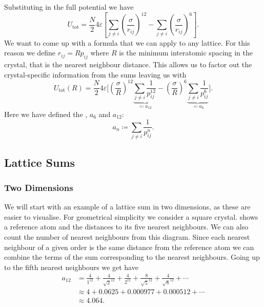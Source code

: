 \documentclass[fleqn]{NotesClass}
\newcommand*{\tot}{\mathrm{tot}}
\begin{document}
    Substituting in the full potential we have
    \begin{equation}
        U_{\tot} = \frac{N}{2}4\varepsilon \left[ \sum_{j\ne i}\left( \frac{\sigma}{r_{ij}} \right)^{12} - \sum_{j\ne i} \left( \frac{\sigma}{r_{ij}} \right)^{6} \right].
    \end{equation}
    We want to come up with a formula that we can apply to any lattice.
    For this reason we define \(r_{ij} = Rp_{ij}\) where \(R\) is the minimum interatomic spacing in the crystal, that is the nearest neighbour distance.
    This allows us to factor out the crystal-specific information from the sums leaving us with
    \begin{equation}
        U_{\tot}(R) = \frac{N}{2}4\varepsilon\bigg[ \left( \frac{\sigma}{R} \right)^{12} \underbrace{\sum_{j\ne i} \frac{1}{p_{ij}^{12}}}_{\eqqcolon a_{12}} - \left( \frac{\sigma}{R} \right)^6 \underbrace{\sum_{j\ne i} \frac{1}{p_{ij}^6}}_{\eqqcolon a_6} \bigg].
    \end{equation}
    Here we have defined the , \(a_6\) and \(a_{12}\):
    \begin{equation}
        a_{n} \coloneqq \sum_{j\ne i} \frac{1}{p_{ij}^n}.
    \end{equation}
    
    \subsection{Lattice Sums}
    \subsubsection{Two Dimensions}
    We will start with an example of a lattice sum in two dimensions, as these are easier to visualise.
    For geometrical simplicity we consider a square crystal.
     shows a reference atom and the distances to its five nearest neighbours.
    We can also count the number of nearest neighbours from this diagram.
    Since each nearest neighbour of a given order is the same distance from the reference atom we can combine the terms of the sum corresponding to the nearest neighbours.
    Going up to the fifth nearest neighbours we get have
    \begin{align}
        a_{12} &= \frac{4}{1^{12}} + \frac{4}{\sqrt{2}^{12}} + \frac{4}{2^{12}} + \frac{8}{\sqrt{5}^{12}} + \frac{4}{\sqrt{8}^{12}} + \dotsb\\
        &\approx 4 + 0.0625 + 0.000977 + 0.000512 + \dotsb\\
        &\approx 4.064.
    \end{align}
    
\end{document}
